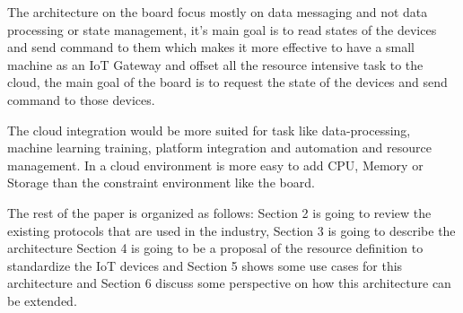 The architecture on the board focus mostly on data messaging and not data 
processing or state management, it's main goal is to read states of the devices 
and send command to them which makes it more effective to have a small machine 
as an IoT Gateway and offset all the resource intensive task to the cloud, the 
main goal of the board is to request the state of the devices and send command 
to those devices.

The cloud integration would be more suited for task like data-processing, 
machine learning training, platform integration and automation and resource 
management. In a cloud environment is more easy to add CPU, Memory or Storage 
than the constraint environment like the board.

The rest of the paper is organized as follows: Section 2 is going to review the 
existing protocols that are used in the industry, Section 3 is going to 
describe the architecture Section 4 is going to be a proposal of the resource 
definition to standardize the IoT devices and Section 5 shows some use cases 
for this architecture and Section 6 discuss some perspective on how this 
architecture can be extended.
